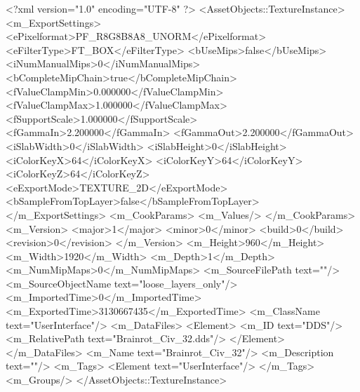 <?xml version="1.0" encoding="UTF-8" ?>
<AssetObjects::TextureInstance>
	<m_ExportSettings>
		<ePixelformat>PF_R8G8B8A8_UNORM</ePixelformat>
		<eFilterType>FT_BOX</eFilterType>
		<bUseMips>false</bUseMips>
		<iNumManualMips>0</iNumManualMips>
		<bCompleteMipChain>true</bCompleteMipChain>
		<fValueClampMin>0.000000</fValueClampMin>
		<fValueClampMax>1.000000</fValueClampMax>
		<fSupportScale>1.000000</fSupportScale>
		<fGammaIn>2.200000</fGammaIn>
		<fGammaOut>2.200000</fGammaOut>
		<iSlabWidth>0</iSlabWidth>
		<iSlabHeight>0</iSlabHeight>
		<iColorKeyX>64</iColorKeyX>
		<iColorKeyY>64</iColorKeyY>
		<iColorKeyZ>64</iColorKeyZ>
		<eExportMode>TEXTURE_2D</eExportMode>
		<bSampleFromTopLayer>false</bSampleFromTopLayer>
	</m_ExportSettings>
	<m_CookParams>
		<m_Values/>
	</m_CookParams>
	<m_Version>
		<major>1</major>
		<minor>0</minor>
		<build>0</build>
		<revision>0</revision>
	</m_Version>
	<m_Height>960</m_Height>
	<m_Width>1920</m_Width>
	<m_Depth>1</m_Depth>
	<m_NumMipMaps>0</m_NumMipMaps>
	<m_SourceFilePath text=""/>
	<m_SourceObjectName text="loose_layers_only"/>
	<m_ImportedTime>0</m_ImportedTime>
	<m_ExportedTime>3130667435</m_ExportedTime>
	<m_ClassName text="UserInterface"/>
	<m_DataFiles>
		<Element>
			<m_ID text="DDS"/>
			<m_RelativePath text="Brainrot_Civ_32.dds"/>
		</Element>
	</m_DataFiles>
	<m_Name text="Brainrot_Civ_32"/>
	<m_Description text=""/>
	<m_Tags>
		<Element text="UserInterface"/>
	</m_Tags>
	<m_Groups/>
</AssetObjects::TextureInstance>

